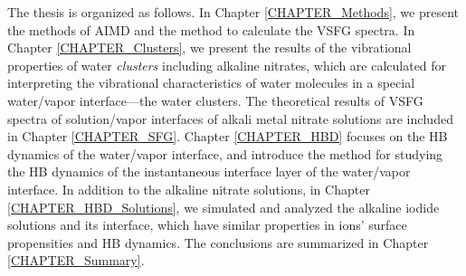 
The thesis is organized as follows. 
In Chapter \ref{CHAPTER_Methods}, we present the methods of AIMD 
and the method to calculate the VSFG spectra.
In Chapter \ref{CHAPTER_Clusters}, we present the results of the vibrational properties of water \emph{clusters} including alkaline nitrates, 
which are calculated for interpreting the vibrational characteristics of water molecules in a special water/vapor interface---the water clusters.
The theoretical results of VSFG spectra of solution/vapor interfaces of alkali metal nitrate solutions are included in Chapter \ref{CHAPTER_SFG}. 
Chapter \ref{CHAPTER_HBD} focuses on the HB dynamics of the water/vapor interface, 
and introduce the method for studying the HB dynamics of the instantaneous interface layer of the water/vapor interface.
In addition to the alkaline nitrate solutions, in Chapter \ref{CHAPTER_HBD_Solutions}, we simulated and analyzed the alkaline iodide solutions and its interface, which have similar properties in ions' surface propensities and HB dynamics. 
The conclusions are summarized in Chapter \ref{CHAPTER_Summary}.
